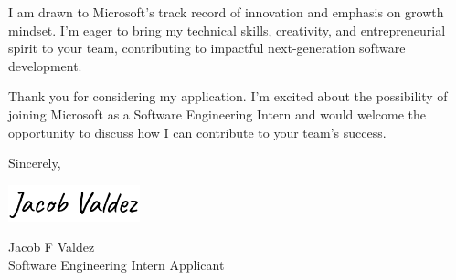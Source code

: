 \documentclass[12pt]{letter}
\newcommand{\myname}{Jacob F Valdez}
\newcommand{\mytitle}{Software Engineering Intern Applicant}
\newcommand{\closer}{Sincerely}
\begin{document}
I am drawn to Microsoft's track record of innovation and emphasis on growth mindset. I'm eager to bring my technical skills, creativity, and entrepreneurial spirit to your team, contributing to impactful next-generation software development.

Thank you for considering my application. I'm excited about the possibility of joining Microsoft as a Software Engineering Intern and would welcome the opportunity to discuss how I can contribute to your team's success.

\vspace{0.1in}
\vfill

\begin{flushright}
    \closer,

    \vspace{-0.1in}\includegraphics[width=1.5in]{sig.png}\vspace{-0.1in}

    \myname\\
    \mytitle
\end{flushright}
\end{document}
